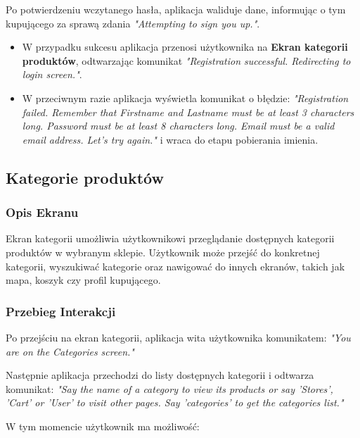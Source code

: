 Po potwierdzeniu wczytanego hasła, aplikacja waliduje dane, informując o tym kupującego za sprawą zdania \textit{"Attempting to sign you up."}.

\begin{itemize}
    \item W przypadku sukcesu aplikacja przenosi użytkownika na \textbf{Ekran kategorii produktów}, odtwarzając komunikat \textit{"Registration successful. Redirecting to login screen."}.
    \item W przeciwnym razie aplikacja wyświetla komunikat o błędzie: \textit{"Registration failed. Remember that Firstname and Lastname must be at least 3 characters long. Password must be at least 8 characters long. Email must be a valid email address. Let's try again."} i wraca do etapu pobierania imienia.
\end{itemize}

\subsection{Kategorie produktów}

\subsubsection{Opis Ekranu}

Ekran kategorii umożliwia użytkownikowi przeglądanie dostępnych kategorii produktów w wybranym sklepie. Użytkownik może przejść do konkretnej kategorii, wyszukiwać kategorie oraz nawigować do innych ekranów, takich jak mapa, koszyk czy profil kupującego.

\subsubsection{Przebieg Interakcji}
Po przejściu na ekran kategorii, aplikacja wita użytkownika komunikatem:  
\textit{"You are on the Categories screen."}

Następnie aplikacja przechodzi do listy dostępnych kategorii i odtwarza komunikat:  
\textit{"Say the name of a category to view its products or say 'Stores', 'Cart' or 'User' to visit other pages. Say 'categories' to get the categories list."}

W tym momencie użytkownik ma możliwość:

